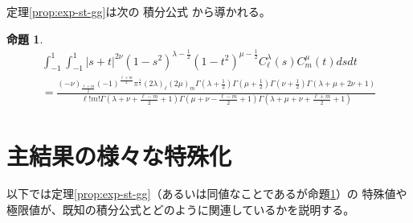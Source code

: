 \documentclass[12pt,a4paper,dvipdfmx]{jsarticle}
\numberwithin{equation}{section}
\theoremstyle{jplain}
\newtheorem{prop}[thm]{命題}
\theoremstyle{remark}
\newtheorem*{remark*}{注意}
\theoremstyle{definition}
\begin{document}
	定理\ref{prop:exp-st-gg}は次の
	積分公式
	から導かれる。
	\begin{prop}
		\label{prop:int-st-gg}
		\begin{multline}
			\int_{- 1}^1 \int_{- 1}^1 | s + t |^{2 \nu} (1 - s^2)^{\lambda - \frac{1}{2}}
			(1 - t^2)^{\mu - \frac{1}{2}} C_\ell^{\lambda} (s) C_m^{\mu} (t) d s d t\\
			=\frac{(- \nu)_{\frac{\ell + m}{2}} (- 1)^{\frac{\ell + m}{2}} \pi^{\frac{1}{2}} (2
			\lambda)_\ell (2 \mu)_m \Gamma \left( \lambda + \frac{1}{2} \right) \Gamma \left(
			\mu + \frac{1}{2} \right) \Gamma \left( \nu + \frac{1}{2} \right) \Gamma
		(\lambda + \mu + 2 \nu + 1)}{\ell!m! \Gamma \left( \lambda + \nu + \frac{\ell -
		m}{2} + 1 \right) \Gamma \left( \mu + \nu - \frac{\ell - m}{2} + 1 \right) \Gamma
		\left( \lambda + \mu + \nu + \frac{\ell + m}{2} + 1 \right)}
			\label{eqn:int-st-gg}
		\end{multline}
	\end{prop}
\section{主結果の様々な特殊化}
以下では定理\ref{prop:exp-st-gg}（あるいは同値なことであるが命題\ref{prop:int-st-gg}）の
特殊値や極限値が、{既知}の積分公式とどのように関連しているかを説明する。
\end{document}
